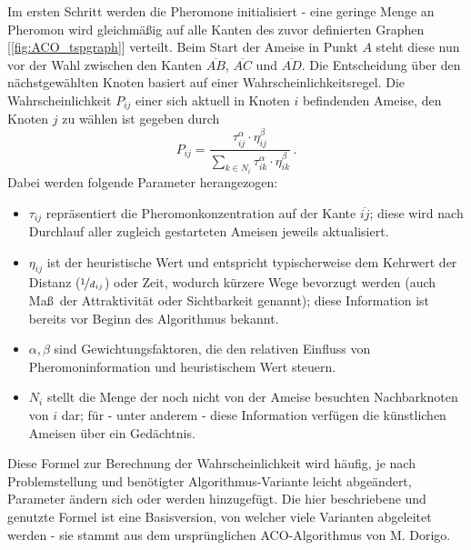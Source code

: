 \documentclass[pdftex,
               12pt,
               DIV=12,
               a4paper,
               twoside,
               parskip=half,
               abstract=true,
               dvipsnames]{scrartcl}
\begin{document}
Im ersten Schritt werden die Pheromone initialisiert - eine geringe Menge an Pheromon wird gleichm\"a\ss ig auf alle Kanten des zuvor definierten Graphen [\cref{fig:ACO_tspgraph}] verteilt.
Beim Start der Ameise in Punkt $A$ steht diese nun vor der Wahl zwischen den Kanten $\overline{AB}$, $\overline{AC}$ und $\overline{AD}$. Die Entscheidung \"uber den n\"achstgew\"ahlten Knoten basiert auf einer Wahrscheinlichkeitsregel. Die Wahrscheinlichkeit $P_{ij}$ einer sich aktuell in Knoten $i$ befindenden Ameise, den Knoten $j$ zu w\"ahlen ist gegeben durch \[P_{ij}=\frac{\tau_{ij}^\alpha \cdot \eta_{ij}^\beta}{\sum_{k \in N_i}\tau_{ik}^\alpha \cdot \eta_{ik}^\beta}\,.\]
Dabei werden folgende Parameter herangezogen:
\begin{itemize}
	\item $\tau_{ij}$ repr\"asentiert die Pheromonkonzentration auf der Kante $\overline{ij}$; diese wird nach Durchlauf aller zugleich gestarteten Ameisen jeweils aktualisiert.
	\item $\eta_{ij}$ ist der heuristische Wert und entspricht typischerweise dem Kehrwert der Distanz ($\nicefrac{1}{d_{ij}}$) oder Zeit, wodurch k\"urzere Wege bevorzugt werden (auch Ma\ss\ der Attraktivit\"at oder Sichtbarkeit genannt); diese Information ist bereits vor Beginn des Algorithmus bekannt.
	\item $\alpha, \beta$ sind Gewichtungsfaktoren, die den relativen Einfluss von Pheromoninformation und heuristischem Wert steuern.
	\item $N_i$ stellt die Menge der noch nicht von der Ameise besuchten Nachbarknoten von $i$ dar; f\"ur - unter anderem - diese Information verf\"ugen die k\"unstlichen Ameisen \"uber ein Ged\"achtnis.
\end{itemize}

Diese Formel zur Berechnung der Wahrscheinlichkeit wird h\"aufig, je nach Problemstellung und ben\"otigter Algorithmus-Variante leicht abge\"andert, Parameter \"andern sich oder werden hinzugef\"ugt. Die hier beschriebene und genutzte Formel ist eine Basisversion, von welcher viele Varianten abgeleitet werden - sie stammt aus dem urspr\"unglichen ACO-Algorithmus von M. Dorigo. \cite[vgl.][]{DorigoStuetzle04}
\end{document}
